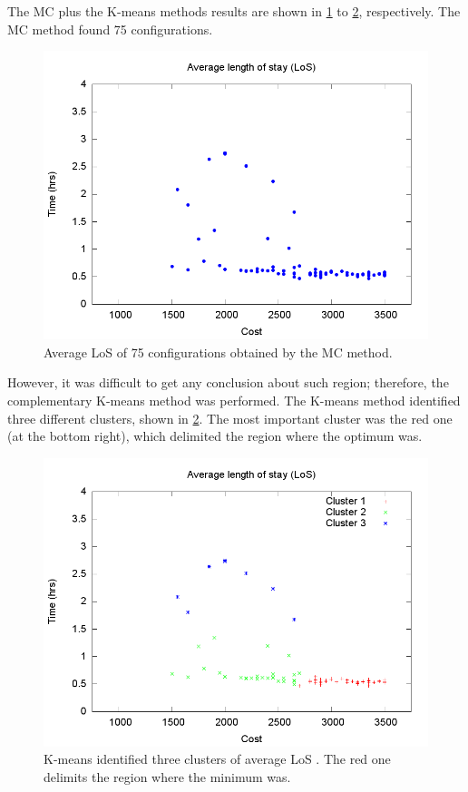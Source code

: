 The MC plus the K-means methods results are shown in \ref{subfig:mc4-1}
to \ref{subfig:km4-1}, respectively. The MC method found 75 configurations.
\begin{figure}[H]
\noindent \centering{}\includegraphics[width=0.95\columnwidth,height=0.23\paperheight]{figs4/v0/MC/MC-6400-602-25-69-25-75confs-LoS}\caption{Average LoS of 75 configurations obtained by the MC method. \label{subfig:mc4-1}}
\end{figure}
 However, it was difficult to get any conclusion about such region;
therefore, the complementary K-means method was performed. The K-means
method identified three different clusters, shown in \ref{subfig:km4-1}.
The most important cluster was the red one (at the bottom right),
which delimited the region where the optimum was. 
\begin{figure}[H]
\noindent \centering{}\includegraphics[width=0.95\columnwidth,height=0.23\paperheight]{figs4/v0/MC/K-means-6400-602-25-69-25-75-Cluster1-36_Cluster2-27_Cluster3-8}\caption{K-means identified three clusters of average LoS . The red one delimits
the region where the minimum was.\label{subfig:km4-1}}
\end{figure}

